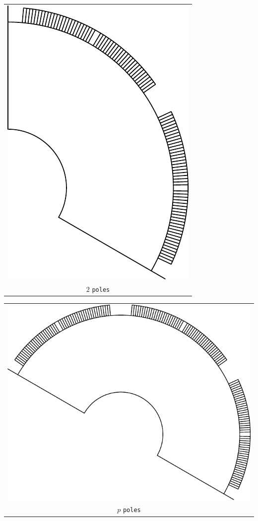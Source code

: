 \documentclass[a4paper,11pt,oneside,fleqn,titlepage]{report}
\begin{document}
\begin{tabular}{c}
\includegraphics[scale=0.75]{../examples/rotors/2pole} 
\\
$ 2 $ \texttt{poles}
\end{tabular}
\vspace{5mm}

\begin{tabular}{c}
\includegraphics[scale=0.75]{../examples/rotors/ppole} 
\\
$ p $ \texttt{poles}
\end{tabular}
\vspace{5mm}
\end{document}
